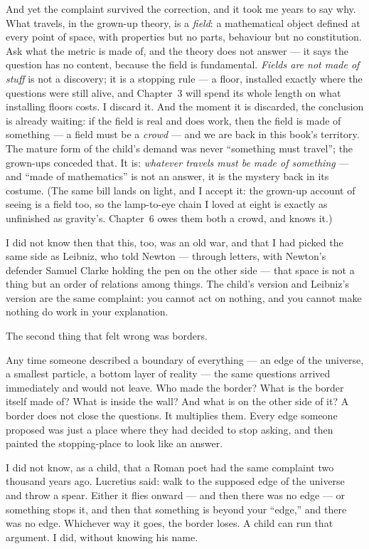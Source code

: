 \documentclass[fontsize=11pt,paper=a4,pagesize=auto,parskip=half-]{scrbook}
\newcommand{\Iy}[1]{#1\index{#1}}
\begin{document}
And yet the complaint survived the correction, and it took me years to say why. What travels, in the grown-up theory, is a \emph{field}: a mathematical object defined at every point of space, with properties but no parts, behaviour but no constitution. Ask what the metric is made of, and the theory does not answer --- it says the question has no content, because the field is fundamental. \emph{Fields are not made of stuff} is not a discovery; it is a stopping rule --- a floor, installed exactly where the questions were still alive, and Chapter~3 will spend its whole length on what installing floors costs. I discard it. And the moment it is discarded, the conclusion is already waiting: if the field is real and does work, then the field is made of something --- a field must be a \emph{crowd} --- and we are back in this book's territory. The mature form of the child's demand was never ``something must travel''; the grown-ups conceded that. It is: \emph{whatever travels must be made of something} --- and ``made of mathematics'' is not an answer, it is the mystery back in its costume. (The same bill lands on light, and I accept it: the grown-up account of seeing is a field too, so the lamp-to-eye chain I loved at eight is exactly as unfinished as gravity's. Chapter~6 owes them both a crowd, and knows it.)

I did not know then that this, too, was an old war, and that I had picked the same side as \Iy{Leibniz}, who told Newton --- through letters, with Newton's defender Samuel \Iy{Clarke} holding the pen on the other side --- that space is not a thing but an order of relations among things. The child's version and Leibniz's version are the same complaint: you cannot act on nothing, and you cannot make nothing do work in your explanation.

The second thing that felt wrong was borders.

Any time someone described a boundary of everything --- an edge of the universe, a smallest particle, a bottom layer of reality --- the same questions arrived immediately and would not leave. Who made the border? What is the border itself made of? What is inside the wall? And what is on the other side of it? A border does not close the questions. It multiplies them. Every edge someone proposed was just a place where they had decided to stop asking, and then painted the stopping-place to look like an answer.

I did not know, as a child, that a Roman poet had the same complaint two thousand years ago. \Iy{Lucretius} said: walk to the supposed edge of the universe and throw a spear. Either it flies onward --- and then there was no edge --- or something stops it, and then that something is beyond your ``edge,'' and there was no edge. Whichever way it goes, the border loses. A child can run that argument. I did, without knowing his name.
\end{document}
